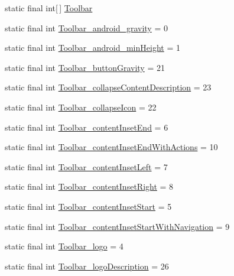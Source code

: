 \begin{CompactItemize}
\item 
static final int\mbox{[}$\,$\mbox{]} \hyperlink{classandroid_1_1support_1_1v4_1_1_r_1_1styleable_0646d71cfbd4a8645c7d805b33e1c574}{Toolbar}
\item 
static final int \hyperlink{classandroid_1_1support_1_1v4_1_1_r_1_1styleable_c8fd7f49fc578cf34e84a402ac885942}{Toolbar\_\-android\_\-gravity} = 0
\item 
static final int \hyperlink{classandroid_1_1support_1_1v4_1_1_r_1_1styleable_66c75941c3656f61bf62178c80516261}{Toolbar\_\-android\_\-minHeight} = 1
\item 
static final int \hyperlink{classandroid_1_1support_1_1v4_1_1_r_1_1styleable_5280809e355d936bf33f4570e3e220a3}{Toolbar\_\-buttonGravity} = 21
\item 
static final int \hyperlink{classandroid_1_1support_1_1v4_1_1_r_1_1styleable_052a3e0cd00166bf0033ee070e9469d0}{Toolbar\_\-collapseContentDescription} = 23
\item 
static final int \hyperlink{classandroid_1_1support_1_1v4_1_1_r_1_1styleable_67413495dc779683b34ca10d393484e9}{Toolbar\_\-collapseIcon} = 22
\item 
static final int \hyperlink{classandroid_1_1support_1_1v4_1_1_r_1_1styleable_a11d101535df2818c53046e1bbf21eb3}{Toolbar\_\-contentInsetEnd} = 6
\item 
static final int \hyperlink{classandroid_1_1support_1_1v4_1_1_r_1_1styleable_40116b816489b853ec057c9c36ebe7c1}{Toolbar\_\-contentInsetEndWithActions} = 10
\item 
static final int \hyperlink{classandroid_1_1support_1_1v4_1_1_r_1_1styleable_58d0345a39808d32a1f60119991bb07e}{Toolbar\_\-contentInsetLeft} = 7
\item 
static final int \hyperlink{classandroid_1_1support_1_1v4_1_1_r_1_1styleable_ec6d939ba7f23b71e3f71aaffe7cde62}{Toolbar\_\-contentInsetRight} = 8
\item 
static final int \hyperlink{classandroid_1_1support_1_1v4_1_1_r_1_1styleable_829314820a2efd83c9b3b622103a1c68}{Toolbar\_\-contentInsetStart} = 5
\item 
static final int \hyperlink{classandroid_1_1support_1_1v4_1_1_r_1_1styleable_f5a322ce2aca1623eb518f2758625f9c}{Toolbar\_\-contentInsetStartWithNavigation} = 9
\item 
static final int \hyperlink{classandroid_1_1support_1_1v4_1_1_r_1_1styleable_f2d9f9e988308a57d3c026af6b7fbbed}{Toolbar\_\-logo} = 4
\item 
static final int \hyperlink{classandroid_1_1support_1_1v4_1_1_r_1_1styleable_511de55d75e2413a6ebdeee92758f44f}{Toolbar\_\-logoDescription} = 26

\end{CompactItemize}
